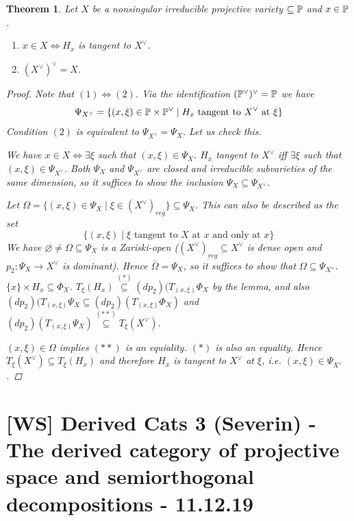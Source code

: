 \documentclass[A4paper, british, reqno]{amsart}
\theoremstyle{darkgreentheorem}
\newtheorem{thm}{Theorem}[section]
\theoremstyle{darkbluedefinition}
\theoremstyle{darkredexample}
\theoremstyle{remark}
\newcommand{\1}{\mathbbm{1}}
\newcommand{\dual}{^{\vee}}
\newcommand{\sub}{\subseteq}
\begin{document}
\begin{thm}
    Let $X$ be a nonsingular irreducible projective variety $\sub \P$ and $x\in \P$.
    \begin{enumerate}
	\item $x\in X \Leftrightarrow H_{x}$ is tangent to $X\dual$.
	\item $(X\dual)\dual = X$.
    \end{enumerate}
    \begin{proof}
	Note that $(1)\Leftrightarrow (2)$.
	Via the identification $(\P\dual)\dual= \P$ we have
	\[ \Psi_{X\dual}=\{ (x,\xi)\in \P\times \P\dual \mid H_{x}\text{ tangent to }X\dual \text{ at }\xi\} \]
	Condition $(2)$ is equivalent to $\Psi_{X\dual}=\Psi_{X}$.
	Let us check this.

	We have $x\in X\Leftrightarrow \exists \xi$ such that $(x,\xi)\in \Psi_{X}$.
	$H_{x}$ tangent to $X\dual$ iff $\exists \xi$ such that $(x,\xi)\in \Psi_{X\dual}$.
	Both $\Psi_{X}$ and $\Psi_{X\dual}$ are closed and irreducible subvarieties of the same dimension, so it suffices to show the inclusion $\Psi_{X}\sub \Psi_{X\dual}$.

	Let $\Omega=\{ (x,\xi)\in \Psi_{X} \mid \xi\in (X\dual)_{reg} \}\sub \Psi_{X}$.
	This can also be described as the set
	\[ \{(x,\xi)\mid \xi \text{ tangent to }X\text{ at }x \text{ and only at }x\} \]
	We have $\varnothing \neq \Omega\sub \Psi_{X}$ is a Zariski-open ($(X\dual)_{reg}\sub X\dual$ is dense open and $p_{2}\colon \Psi_{X}\to X\dual$ is dominant).
	Hence $\bar{\Omega}=\Psi_{X}$, so it suffices to show that $\Omega\sub \Psi_{X\dual}$.
	$\{x\}\times H_{x}\sub \Phi_{X}$.
	$T_{\xi}(H_{x})\overset{(*)}{\sub} (dp_{2})(T_{(x,\xi)}\Phi_{X}$ by the lemma, and also $(dp_{2})(T_{(x,\xi)}\Psi_{X}\sub (dp_{2})(T_{(x,\xi)}\Phi_{X})$ and $(dp_{2})(T_{(x,\xi)}\Psi_{X})\overset{(**)}{\sub} T_{\xi}(X\dual)$.

	$(x,\xi)\in \Omega$ implies $(**)$ is an equiality.
	$(*)$ is also an equality.
	Hence $T_{\xi}(X\dual)\sub T_{\xi}(H_{x})$ and therefore $H_{x}$ is tangent to $X\dual $ at $\xi$, i.e. $(x,\xi)\in \Psi_{X\dual}$.
    \end{proof}
\end{thm}

\section{[WS] Derived Cats 3 (Severin) - The derived category of projective space and semiorthogonal decompositions - 11.12.19}
\end{document}
